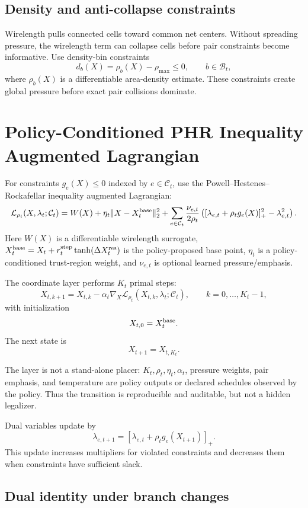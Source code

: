 \documentclass[11pt]{article}
\newcommand{\Bset}{\mathcal{B}}
\newcommand{\Constraint}{\mathcal{C}}
\newcommand{\Lagr}{\mathcal{L}}
\begin{document}
\subsection{Density and anti-collapse constraints}

Wirelength pulls connected cells toward common net centers. Without spreading pressure, the wirelength term can collapse cells before pair constraints become informative. Use density-bin constraints
\[
    d_b(X)=\rho_b(X)-\rho_{\max}\le0,
    \qquad b\in\Bset_t,
\]
where $\rho_b(X)$ is a differentiable area-density estimate. These constraints create global pressure before exact pair collisions dominate.

\section{Policy-Conditioned PHR Inequality Augmented Lagrangian}

For constraints $g_e(X)\le0$ indexed by $e\in\Constraint_t$, use the Powell--Hestenes--Rockafellar inequality augmented Lagrangian:
\[
    \Lagr_{\rho_t}(X,\lambda_t;\Constraint_t)
    =W(X)+\eta_t\|X-X_t^{\rm base}\|_2^2
    +\sum_{e\in\Constraint_t}
    \frac{\nu_{e,t}}{2\rho_t}
    \left(
        [\lambda_{e,t}+\rho_t g_e(X)]_+^2-\lambda_{e,t}^2
    \right).
\]
Here $W(X)$ is a differentiable wirelength surrogate, $X_t^{\rm base}=X_t+r_t^{\rm step}\tanh(\Delta X_t^{\rm res})$ is the policy-proposed base point, $\eta_t$ is a policy-conditioned trust-region weight, and $\nu_{e,t}$ is optional learned pressure/emphasis.

The coordinate layer performs $K_t$ primal steps:
\[
    X_{t,k+1}=X_{t,k}-\alpha_t
    \nabla_X\Lagr_{\rho_t}(X_{t,k},\lambda_t;\Constraint_t),
    \qquad k=0,\ldots,K_t-1,
\]
with initialization
\[
    X_{t,0}=X_t^{\rm base}.
\]
The next state is
\[
    X_{t+1}=X_{t,K_t}.
\]

The layer is not a stand-alone placer: $K_t,\rho_t,\eta_t,\alpha_t$, pressure weights, pair emphasis, and temperature are policy outputs or declared schedules observed by the policy. Thus the transition is reproducible and auditable, but not a hidden legalizer.

Dual variables update by
\[
    \lambda_{e,t+1}=[\lambda_{e,t}+\rho_t g_e(X_{t+1})]_+.
\]
This update increases multipliers for violated constraints and decreases them when constraints have sufficient slack.

\subsection{Dual identity under branch changes}
\end{document}
